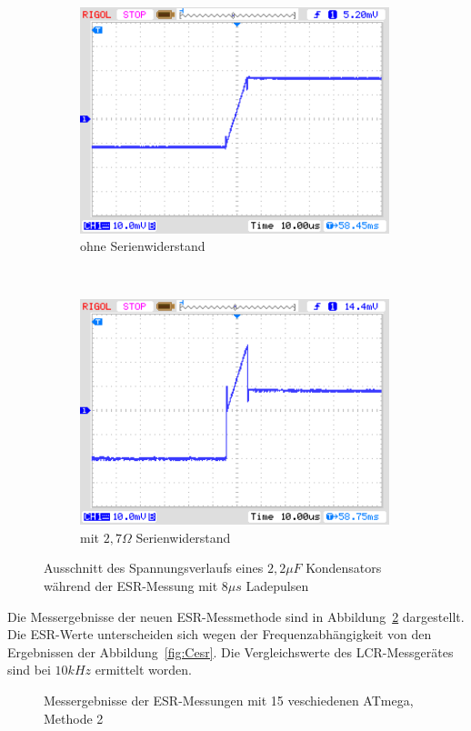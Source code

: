 \begin{figure}[H]
  \begin{subfigure}[b]{9cm}
    \centering
    \includegraphics[width=9cm]{../PNG/NewEsr2u2F0R0zoom.png}
    \caption{ohne Serienwiderstand}
  \end{subfigure}
  ~
  \begin{subfigure}[b]{9cm}
    \centering
    \includegraphics[width=9cm]{../PNG/NewEsr2u2F2R7zoom.png}
    \caption{mit \(2,7\Omega\) Serienwiderstand}
  \end{subfigure}
  \caption{Ausschnitt des Spannungsverlaufs eines \(2,2\mu F\) Kondensators während der ESR-Messung mit \(8 \mu s\) Ladepulsen}
  \label{pic:NewEsr2zoom}
\end{figure}
 

Die Messergebnisse der neuen ESR-Messmethode sind in Abbildung~\ref{fig:Cesr2} dargestellt.
Die ESR-Werte unterscheiden sich wegen der Frequenzabhängigkeit von den Ergebnissen der Abbildung~\ref{fig:Cesr}.
Die Vergleichswerte des LCR-Messgerätes sind bei \(10 kHz\) ermittelt worden.

\begin{figure}[H]
\centering

\caption{Messergebnisse der ESR-Messungen mit 15 veschiedenen ATmega, Methode 2}
\label{fig:Cesr2}
\end{figure}

